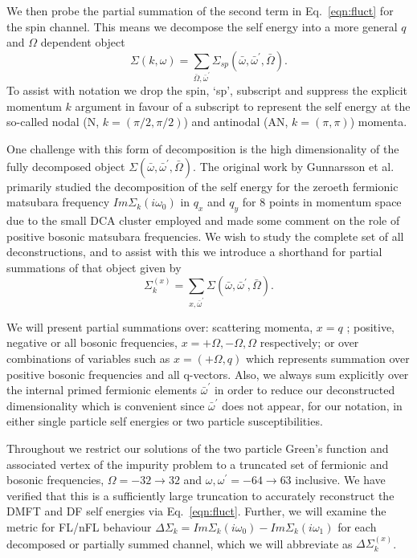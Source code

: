 \documentclass[twocolumn,notitlepage,prb,superscriptaddress,showpacs]{revtex4-1}
\begin{document}
We then probe the partial summation of the second term in Eq.~\eqref{eqn:fluct} for the spin channel.  This means we decompose the self energy into a more general $q$ and $\Omega$ dependent object
\begin{equation}
    \Sigma(k,\omega)= \sum\limits_{\bar{\Omega},\bar{\omega}^\prime} \Sigma_{sp}(\bar{\omega},\bar{\omega}^\prime, \bar{\Omega}).
\end{equation}
To assist with notation we drop the spin, `sp', subscript and suppress the explicit momentum $k$ argument in favour of a subscript to represent the self energy at the so-called nodal (N, $k=(\pi/2,\pi/2)$) and antinodal (AN, $k=(\pi,\pi)$) momenta.

One challenge with this form of decomposition is the high dimensionality of the fully decomposed object $\Sigma(\bar{\omega},\bar{\omega}^\prime, \bar{\Omega})$.  The original work by Gunnarsson et al.\cite{gunnarsson:2015} primarily studied the decomposition of the self energy for the zeroeth fermionic matsubara frequency $Im\Sigma_k(i\omega_0)$ in $q_x$ and $q_y$ for 8 points in momentum space due to the small DCA cluster employed and made some comment on the role of positive bosonic matsubara frequencies.  We wish to study the complete set of all deconstructions, and to assist with this we introduce a shorthand for partial summations of that object given by
\begin{equation}\label{eqn:sumnotation}
    \Sigma_k^{(x)}= \sum\limits_{x, \bar{\omega}^\prime} \Sigma(\bar{\omega},\bar{\omega}^\prime, \bar{\Omega}).
\end{equation}

We will present partial summations over: scattering momenta, $x=q$ ;  positive, negative or all bosonic frequencies, $x= +\Omega, -\Omega, \Omega$ respectively; or over combinations of variables such as $x=(+\Omega, q)$ which represents summation over positive bosonic frequencies and all q-vectors. Also, we always sum explicitly over the internal primed fermionic elements $\bar{\omega}^\prime$ in order to reduce our deconstructed dimensionality which is convenient since $\bar{\omega}^\prime$ does not appear, for our notation, in either single particle self energies or two particle susceptibilities.

Throughout we restrict our solutions of the two particle Green's function and associated vertex of the impurity problem to a truncated set of fermionic and bosonic frequencies, $\Omega= -32 \to 32$ and $\omega,\omega^\prime = -64 \to 63$ inclusive.  We have verified that this is a sufficiently large truncation to accurately reconstruct the  DMFT and DF self energies via Eq.~\eqref{eqn:fluct}.
Further, we will examine the metric for FL/nFL behaviour $\Delta \Sigma_k= Im\Sigma_k(i\omega_0)-Im\Sigma_k(i\omega_1)$ for each decomposed  or partially summed channel, which we will abbreviate as $\Delta \Sigma _{k}^{(x)}$. 
\end{document}

